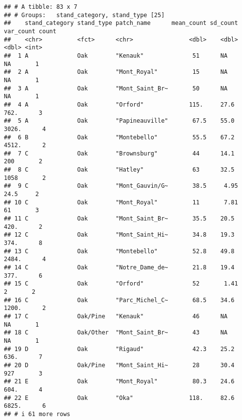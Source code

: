\documentclass[
]{article}
\begin{document}
\begin{verbatim}
## # A tibble: 83 x 7
## # Groups:   stand_category, stand_type [25]
##    stand_category stand_type patch_name      mean_count sd_count var_count count
##    <chr>          <fct>      <chr>                <dbl>    <dbl>     <dbl> <int>
##  1 A              Oak        "Kenauk"              51      NA         NA       1
##  2 A              Oak        "Mont_Royal"          15      NA         NA       1
##  3 A              Oak        "Mont_Saint_Br~       50      NA         NA       1
##  4 A              Oak        "Orford"             115.     27.6      762.      3
##  5 A              Oak        "Papineauville"       67.5    55.0     3026.      4
##  6 B              Oak        "Montebello"          55.5    67.2     4512.      2
##  7 C              Oak        "Brownsburg"          44      14.1      200       2
##  8 C              Oak        "Hatley"              63      32.5     1058       2
##  9 C              Oak        "Mont_Gauvin/G~       38.5     4.95      24.5     2
## 10 C              Oak        "Mont_Royal"          11       7.81      61       3
## 11 C              Oak        "Mont_Saint_Br~       35.5    20.5      420.      2
## 12 C              Oak        "Mont_Saint_Hi~       34.8    19.3      374.      8
## 13 C              Oak        "Montebello"          52.8    49.8     2484.      4
## 14 C              Oak        "Notre_Dame_de~       21.8    19.4      377.      6
## 15 C              Oak        "Orford"              52       1.41       2       2
## 16 C              Oak        "Parc_Michel_C~       68.5    34.6     1200.      2
## 17 C              Oak/Pine   "Kenauk"              46      NA         NA       1
## 18 C              Oak/Other  "Mont_Saint_Br~       43      NA         NA       1
## 19 D              Oak        "Rigaud"              42.3    25.2      636.      7
## 20 D              Oak/Pine   "Mont_Saint_Hi~       28      30.4      927       3
## 21 E              Oak        "Mont_Royal"          80.3    24.6      604.      4
## 22 E              Oak        "Oka"                118.     82.6     6825.      6
## # i 61 more rows
\end{verbatim}
\end{document}
